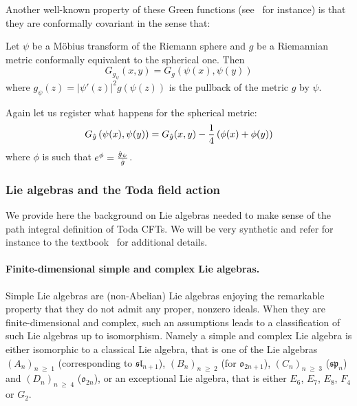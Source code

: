 \documentclass[AHL,Unicode,longabstracts,published]{cedram}
\renewcommand{\geq}{\;\geqslant\;}
\newcommand{\frksl}{\mathfrak{sl}}
\newcommand{\frko}{\mathfrak{o}}
\newcommand{\frksp}{\mathfrak{sp}}
\newcommand{\norm}[1]{\left\lvert#1\right\rvert}
\let\oldhat\hat
\renewcommand*{\hat}[1]{\mathchoice{\widehat{#1}}{\widehat{#1}}{\oldhat{#1}}{\oldhat{#1}}}
\begin{document}
Another well-known property of these Green functions (see~\cite[Proposition~2.2]{DKRV} for instance) is that they are conformally covariant in the sense that:
\begin{lemm}\label{conformal_covariance_green}
Let $\psi$ be a M\"obius transform of the Riemann sphere and $g$ be a Riemannian metric conformally equivalent to the spherical one. Then
\begin{equation}
G_{g_{\psi}}(x,y)=G_g\left(\psi(x),\psi(y)\right)
\end{equation}
where $g_{\psi}(z)=\norm{\psi'(z)}^2g(\psi(z))$ is the pullback of the metric $g$ by $\psi$.
\end{lemm}

Again let us register what happens for the spherical metric:
\begin{equation}\label{conformal_spherical}
G_{\hat g}\left(\psi(x),\psi(y)\right)=G_{\hat g}(x,y)-\frac14\left(\phi(x)+\phi(y)\right)
\end{equation}
where $\phi$ is such that $e^{\phi}=\frac{\hat g_{\psi}}{\hat g}$.


\subsubsection{Lie algebras and the Toda field action}\label{Lie_reminders}
We provide here the background on Lie algebras needed to make sense of the path integral definition of Toda CFTs. We will be very synthetic and refer for instance to the textbook~\cite{Hum72} for additional details.

\paragraph{Finite-dimensional simple and complex Lie algebras.} Simple Lie algebras are (non-Abelian) Lie algebras enjoying the remarkable property that they do not admit any proper, nonzero ideals. When they are finite-dimensional and complex, such an assumptions leads to a classification of such Lie algebras up to isomorphism. Namely a simple and complex Lie algebra is either isomorphic to a classical Lie algebra, that is one of the Lie algebras $(A_n)_{n\geq 1}$ (corresponding to $\frksl_{n+1}$), $(B_n)_{n\geq 2}$ (for $\frko_{2n+1}$), $(C_n)_{n\geq 3}$ ($\frksp_n$) and $(D_n)_{n\geq 4}$ ($\frko_{2n}$), or an exceptional Lie algebra, that is either $E_6$, $E_7$, $E_8$, $F_4$ or $G_2$.
\end{document}
